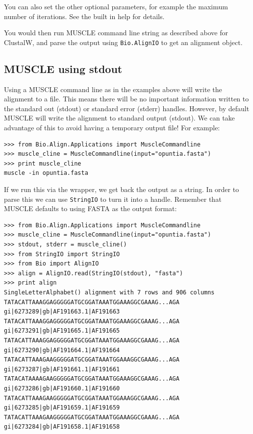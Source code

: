 \documentclass{report}
\begin{document}
You can also set the other optional parameters, for example the maximum number
of iterations. See the built in help for details.

You would then run MUSCLE command line string as described above for
ClustalW, and parse the output using \verb|Bio.AlignIO| to get an
alignment object.

\subsection{MUSCLE using stdout}

Using a MUSCLE command line as in the examples above will write the alignment
to a file. This means there will be no important information written to the
standard out (stdout) or standard error (stderr) handles. However, by default
MUSCLE will write the alignment to standard output (stdout). We can take
advantage of this to avoid having a temporary output file! For example:

\begin{verbatim}
>>> from Bio.Align.Applications import MuscleCommandline
>>> muscle_cline = MuscleCommandline(input="opuntia.fasta")
>>> print muscle_cline
muscle -in opuntia.fasta
\end{verbatim}

If we run this via the wrapper, we get back the output as a string. In order
to parse this we can use \verb|StringIO| to turn it into a handle.
Remember that MUSCLE defaults to using FASTA as the output format:

\begin{verbatim}
>>> from Bio.Align.Applications import MuscleCommandline
>>> muscle_cline = MuscleCommandline(input="opuntia.fasta")
>>> stdout, stderr = muscle_cline()
>>> from StringIO import StringIO
>>> from Bio import AlignIO
>>> align = AlignIO.read(StringIO(stdout), "fasta")
>>> print align
SingleLetterAlphabet() alignment with 7 rows and 906 columns
TATACATTAAAGGAGGGGGATGCGGATAAATGGAAAGGCGAAAG...AGA gi|6273289|gb|AF191663.1|AF191663
TATACATTAAAGGAGGGGGATGCGGATAAATGGAAAGGCGAAAG...AGA gi|6273291|gb|AF191665.1|AF191665
TATACATTAAAGGAGGGGGATGCGGATAAATGGAAAGGCGAAAG...AGA gi|6273290|gb|AF191664.1|AF191664
TATACATTAAAGAAGGGGGATGCGGATAAATGGAAAGGCGAAAG...AGA gi|6273287|gb|AF191661.1|AF191661
TATACATAAAAGAAGGGGGATGCGGATAAATGGAAAGGCGAAAG...AGA gi|6273286|gb|AF191660.1|AF191660
TATACATTAAAGAAGGGGGATGCGGATAAATGGAAAGGCGAAAG...AGA gi|6273285|gb|AF191659.1|AF191659
TATACATTAAAGAAGGGGGATGCGGATAAATGGAAAGGCGAAAG...AGA gi|6273284|gb|AF191658.1|AF191658
\end{verbatim}
\end{document}
